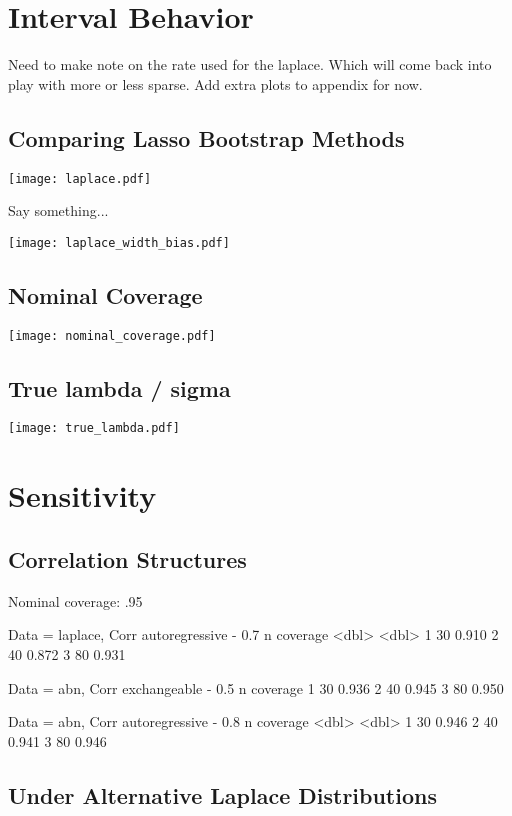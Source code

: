 \section{Interval Behavior}

Need to make note on the rate used for the laplace. Which will come back into play with more or less sparse. Add extra plots to appendix for now.

\subsection{Comparing Lasso Bootstrap Methods}

\texttt{[image: laplace.pdf]}

Say something...

\texttt{[image: laplace\_width\_bias.pdf]}

\subsection{Nominal Coverage}

\texttt{[image: nominal\_coverage.pdf]}

\subsection{True lambda / sigma}

\texttt{[image: true\_lambda.pdf]}

\section{Sensitivity}

\subsection{Correlation Structures}

Nominal coverage: .95

Data = laplace, Corr autoregressive - 0.7
      n coverage
  <dbl>    <dbl>
1    30    0.910
2    40    0.872
3    80    0.931

Data = abn, Corr exchangeable - 0.5
      n coverage
1    30    0.936
2    40    0.945
3    80    0.950

Data = abn, Corr autoregressive - 0.8
      n coverage
  <dbl>    <dbl>
1    30    0.946
2    40    0.941
3    80    0.946

\subsection{Under Alternative Laplace Distributions}

